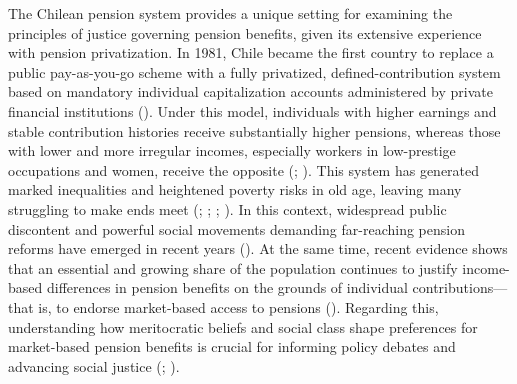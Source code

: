 \documentclass[
  12pt,
]{article}
\begin{document}
The Chilean pension system provides a unique setting for examining the
principles of justice governing pension benefits, given its extensive
experience with pension privatization. In 1981, Chile became the first
country to replace a public pay-as-you-go scheme with a fully
privatized, defined-contribution system based on mandatory individual
capitalization accounts administered by private financial institutions
(). Under this model,
individuals with higher earnings and stable contribution histories
receive substantially higher pensions, whereas those with lower and more
irregular incomes, especially workers in low-prestige occupations and
women, receive the opposite (; ). This system has generated marked inequalities and heightened
poverty risks in old age, leaving many struggling to make ends meet
(;
;
;
). In this context, widespread public
discontent and powerful social movements demanding far-reaching pension
reforms have emerged in recent years (). At the same time, recent evidence shows that an
essential and growing share of the population continues to justify
income-based differences in pension benefits on the grounds of
individual contributions---that is, to endorse market-based access to
pensions (). Regarding this, understanding how meritocratic beliefs and
social class shape preferences for market-based pension benefits is
crucial for informing policy debates and advancing social justice
(;
).
\end{document}
